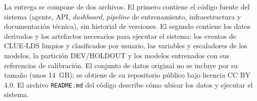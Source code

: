 \label{anexo:contenido-entrega}

La entrega se compone de dos archivos. El primero contiene el código fuente del sistema (agente, API, \emph{dashboard}, \emph{pipeline} de entrenamiento, infraestructura y documentación técnica), sin historial de versiones. El segundo contiene los datos derivados y los artefactos necesarios para ejecutar el sistema: los eventos de CLUE-LDS limpios y clasificados por usuario, las variables y escaladores de los modelos, la partición DEV/HOLDOUT y los modelos entrenados con sus referencias de calibración. El conjunto de datos original no se incluye por su tamaño (unos 14~GB); se obtiene de su repositorio público \parencite{Landauer2022Dataset} bajo licencia CC BY 4.0. El archivo \texttt{README.md} del código describe cómo ubicar los datos y ejecutar el sistema.
